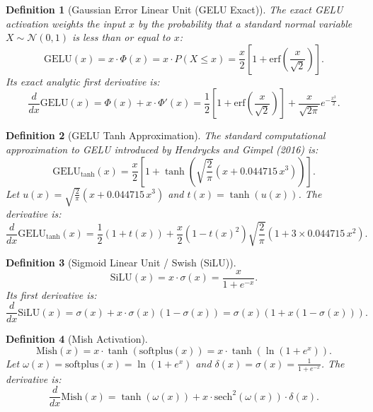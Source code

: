 \documentclass[11pt]{article}
\newtheorem{definition}{Definition}
\begin{document}
\begin{definition}[Gaussian Error Linear Unit (GELU Exact)]
\label{def:gelu_exact}
The exact GELU activation weights the input $x$ by the probability that a standard normal variable $X \sim \mathcal{N}(0, 1)$ is less than or equal to $x$:
\begin{equation}
\label{eq:gelu_exact}
\text{GELU}(x) = x \cdot \Phi(x) = x \cdot P(X \le x) = \frac{x}{2} \left[ 1 + \text{erf}\left( \frac{x}{\sqrt{2}} \right) \right].
\end{equation}
Its exact analytic first derivative is:
\begin{equation}
\label{eq:gelu_exact_grad}
\frac{d}{dx}\text{GELU}(x) = \Phi(x) + x \cdot \Phi'(x) = \frac{1}{2} \left[ 1 + \text{erf}\left( \frac{x}{\sqrt{2}} \right) \right] + \frac{x}{\sqrt{2\pi}} e^{-\frac{x^2}{2}}.
\end{equation}
\end{definition}

\begin{definition}[GELU Tanh Approximation]
\label{def:gelu_tanh}
The standard computational approximation to GELU introduced by Hendrycks and Gimpel (2016) is:
\begin{equation}
\label{eq:gelu_tanh}
\text{GELU}_{\text{tanh}}(x) = \frac{x}{2} \left[ 1 + \tanh\left( \sqrt{\frac{2}{\pi}} \left( x + 0.044715 \, x^3 \right) \right) \right].
\end{equation}
Let $u(x) = \sqrt{\frac{2}{\pi}} (x + 0.044715 \, x^3)$ and $t(x) = \tanh(u(x))$. The derivative is:
\begin{equation}
\frac{d}{dx}\text{GELU}_{\text{tanh}}(x) = \frac{1}{2} (1 + t(x)) + \frac{x}{2} (1 - t(x)^2) \sqrt{\frac{2}{\pi}} (1 + 3 \times 0.044715 \, x^2).
\end{equation}
\end{definition}

\begin{definition}[Sigmoid Linear Unit / Swish (SiLU)]
\label{def:silu}
\begin{equation}
\text{SiLU}(x) = x \cdot \sigma(x) = \frac{x}{1 + e^{-x}}.
\end{equation}
Its first derivative is:
\begin{equation}
\frac{d}{dx}\text{SiLU}(x) = \sigma(x) + x \cdot \sigma(x)(1 - \sigma(x)) = \sigma(x) (1 + x(1 - \sigma(x))).
\end{equation}
\end{definition}

\begin{definition}[Mish Activation]
\label{def:mish}
\begin{equation}
\text{Mish}(x) = x \cdot \tanh(\text{softplus}(x)) = x \cdot \tanh(\ln(1 + e^x)).
\end{equation}
Let $\omega(x) = \text{softplus}(x) = \ln(1 + e^x)$ and $\delta(x) = \sigma(x) = \frac{1}{1 + e^{-x}}$. The derivative is:
\begin{equation}
\frac{d}{dx}\text{Mish}(x) = \tanh(\omega(x)) + x \cdot \text{sech}^2(\omega(x)) \cdot \delta(x).
\end{equation}
\end{definition}
\end{document}
